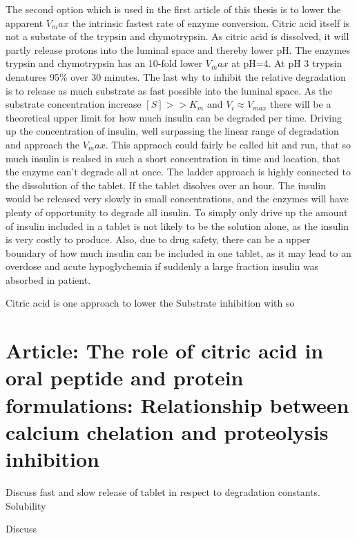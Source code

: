 The second option which is used in the first article \cite{welling2014citric} of this thesis is to lower the apparent $V_max$ the intrinsic fastest rate of enzyme conversion. Citric acid itself is not a substate of the trypsin and chymotrypsin. As citric acid is dissolved, it will partly release protons into the luminal space and thereby lower pH. The enzymes trypsin and chymotrypsin has an 10-fold lower $V_max$ at pH=4. At pH 3 trypsin denatures 95\% over 30 minutes.
The last why to inhibit the relative degradation is to release as much substrate as fast possible into the luminal space. As the substrate concentration increase $[S] >> K_m$ and $V_i \approx V_{max}$ there will be a theoretical upper limit for how much insulin can be degraded per time. Driving up the concentration of insulin, well surpassing the linear range of degradation and approach the $V_max$. This appraoch could fairly be called hit and run, that so much insulin is realsed in such a short concentration in time and location, that the enzyme can't degrade all at once. The ladder approach is highly connected to the dissolution of the tablet. If the tablet disolves over an hour. The insulin would be released very slowly in small concentrations, and the enzymes will have plenty of opportunity to degrade all insulin. To simply only drive up the amount of insulin included in a tablet is not likely to be the solution alone, as the insulin is very costly to produce. Also, due to drug safety, there can be a upper boundary of how much insulin can be included in one tablet, as it may lead to an overdose and acute hypoglychemia if suddenly a large fraction insulin was absorbed in patient.

Citric acid is one approach to lower the 
Substrate inhibition with so


\subsection{}

\section{Article: The role of citric acid in oral peptide and protein formulations:
Relationship between calcium chelation and proteolysis inhibition}

\newpage




Discuss fast and slow release of tablet in respect to degradation constants. Solubility

Discuss 